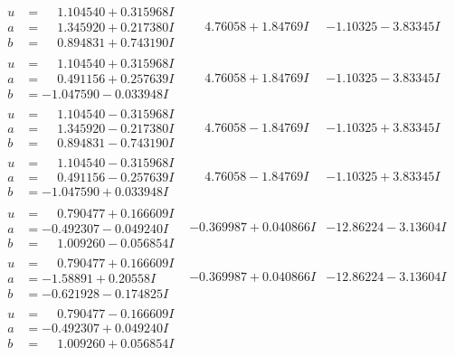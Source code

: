\documentclass[1p]{elsarticle_modified}
\theoremstyle{definition}
\begin{document}
$$\begin{array}{c|c|c}
\begin{aligned}
u &= \phantom{-}1.104540 + 0.315968 I \\
a &= \phantom{-}1.345920 + 0.217380 I \\
b &= \phantom{-}0.894831 + 0.743190 I\end{aligned}
 & \phantom{-}4.76058 + 1.84769 I & -1.10325 - 3.83345 I \\ \hline\begin{aligned}
u &= \phantom{-}1.104540 + 0.315968 I \\
a &= \phantom{-}0.491156 + 0.257639 I \\
b &= -1.047590 - 0.033948 I\end{aligned}
 & \phantom{-}4.76058 + 1.84769 I & -1.10325 - 3.83345 I \\ \hline\begin{aligned}
u &= \phantom{-}1.104540 - 0.315968 I \\
a &= \phantom{-}1.345920 - 0.217380 I \\
b &= \phantom{-}0.894831 - 0.743190 I\end{aligned}
 & \phantom{-}4.76058 - 1.84769 I & -1.10325 + 3.83345 I \\ \hline\begin{aligned}
u &= \phantom{-}1.104540 - 0.315968 I \\
a &= \phantom{-}0.491156 - 0.257639 I \\
b &= -1.047590 + 0.033948 I\end{aligned}
 & \phantom{-}4.76058 - 1.84769 I & -1.10325 + 3.83345 I \\ \hline\begin{aligned}
u &= \phantom{-}0.790477 + 0.166609 I \\
a &= -0.492307 - 0.049240 I \\
b &= \phantom{-}1.009260 - 0.056854 I\end{aligned}
 & -0.369987 + 0.040866 I & -12.86224 - 3.13604 I \\ \hline\begin{aligned}
u &= \phantom{-}0.790477 + 0.166609 I \\
a &= -1.58891 + 0.20558 I \\
b &= -0.621928 - 0.174825 I\end{aligned}
 & -0.369987 + 0.040866 I & -12.86224 - 3.13604 I \\ \hline\begin{aligned}
u &= \phantom{-}0.790477 - 0.166609 I \\
a &= -0.492307 + 0.049240 I \\
b &= \phantom{-}1.009260 + 0.056854 I\end{aligned}

\end{array}$$
\end{document}
